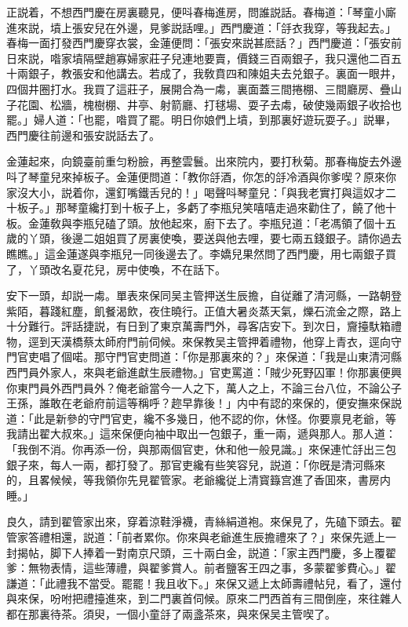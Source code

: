 正説着，不想西門慶在房裏聽見，便呌春梅進房，問誰説話。春梅道：「琴童小廝進來説，墳上張安兒在外邊，見爹説話哩。」西門慶道：「㧱衣我穿，等我起去。」春梅一面打發西門慶穿衣裳，金蓮便問：「張安來説甚麽話？」西門慶道：「張安前日來説，喒家墳隔壁趙寡婦家莊子兒連地要賣，價錢三百兩銀子，我只還他二百五十兩銀子，教張安和他講去。若成了，我敎賁四和陳姐夫去兑銀子。裏面一眼井，四個井圈打水。我買了這莊子，展開合為一䖏，裏面蓋三間捲棚、三間廳房、疊山子花園、松牆，槐樹棚、井亭、射箭廳、打毬場、耍子去䖏，破使幾兩銀子收拾也罷。」婦人道：「也罷，喒買了罷。明日你娘們上墳，到那裏好遊玩耍子。」説畢，西門慶往前邊和張安説話去了。

金蓮起來，向鏡臺前重匀粉臉，再整雲鬟。出來院内，要打秋菊。那春梅旋去外邊呌了琴童兒來掉板子。金蓮便問道：「教你㧱酒，你怎的㧱冷酒與你爹喫？原來你家沒大小，説着你，還釘嘴鐵舌兒的！」喝聲呌琴童兒：「與我老實打與這奴才二十板子。」那琴童纔打到十板子上，多虧了李瓶兒笑嘻嘻走過來勸住了，饒了他十板。金蓮敎與李瓶兒磕了頭。放他起來，廚下去了。李瓶兒道：「老馮領了個十五歲的丫頭，後邊二姐姐買了房裏使喚，要送與他去哩，要七兩五錢銀子。請你過去瞧瞧。」這金蓮遂與李瓶兒一同後邊去了。李嬌兒果然問了西門慶，用七兩銀子買了，丫頭改名夏花兒，房中使喚，不在話下。

安下一頭，却説一䖏。單表來保同吴主管押送生辰擔，自従離了清河縣，一路朝登紫陌，暮踐紅塵，飢餐渴飲，夜住曉行。正值大暑炎蒸天氣，爍石流金之際，路上十分難行。評話捷説，有日到了東京萬壽門外，尋客店安下。到次日，齎擡馱箱禮物，逕到天漢橋蔡太師府門前伺候。來保教吴主管押着禮物，他穿上青衣，逕向守門官吏唱了個喏。那守門官吏問道：「你是那裏來的？」來保道：「我是山東清河縣西門員外家人，來與老爺進獻生辰禮物。」官吏罵道：「賊少死野囚軍！你那裏便興你東門員外西門員外？俺老爺當今一人之下，萬人之上，不論三台八位，不論公子王孫，誰敢在老爺府前這等稱呼？趂早靠後！」内中有認的來保的，便安撫來保説道：「此是新參的守門官吏，纔不多幾日，他不認的你，休怪。你要禀見老爺，等我請出翟大叔來。」這來保便向袖中取出一包銀子，重一兩，遞與那人。那人道：「我倒不消。你再添一份，與那兩個官吏，休和他一般見識。」來保連忙㧱出三包銀子來，每人一兩，都打發了。那官吏纔有些笑容兒，説道：「你旣是清河縣來的，且畧候候，等我領你先見翟管家。老爺纔従上清寳籙宫進了香囬來，書房内睡。」

良久，請到翟管家出來，穿着涼鞋淨襪，青絲絹道袍。來保見了，先磕下頭去。翟管家答禮相還，説道：「前者累你。你來與老爺進生辰擔禮來了？」來保先遞上一封揭帖，脚下人捧着一對南京尺頭，三十兩白金，説道：「家主西門慶，多上覆翟爹：無物表情，這些薄禮，與翟爹賞人。前者鹽客王四之事，多蒙翟爹費心。」翟謙道：「此禮我不當受。罷罷！我且收下。」來保又遞上太師壽禮帖兒，看了，還付與來保，吩咐把禮擡進來，到二門裏首伺候。原來二門西首有三間倒座，來往雜人都在那裏待茶。須臾，一個小童㧱了兩盞茶來，與來保吴主管喫了。

